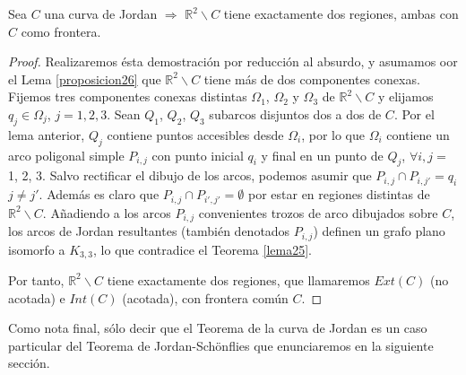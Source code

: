 \begin{theorem}
	Sea $C$ una curva de Jordan $\Rightarrow$ $\mathbb{R}^2 \backslash C$ tiene exactamente dos regiones, ambas con $C$ como frontera.
\end{theorem}

\begin{proof}
Realizaremos ésta demostración por reducción al absurdo, y asumamos oor el Lema \ref{proposicion26}  que $\mathbb{R}^2 \backslash C$ tiene más de dos componentes conexas. Fijemos  tres componentes conexas distintas $\Omega_1$, $\Omega_2$ y $\Omega_3$ de $\mathbb{R}^2 \backslash C$ y elijamos $q_j\in \Omega_j$, $j=1,2,3$.
Sean $Q_1$, $Q_2$, $Q_3$ subarcos disjuntos dos a dos de $C$. 	 Por el lema anterior, $Q_j$ contiene puntos accesibles desde $\Omega_i$, por lo que $\Omega_i$ contiene un arco poligonal simple $P_{i,j}$ con punto inicial $q_i$ y final en un punto de $Q_j$,  $\forall i,j =$ 1, 2, 3. Salvo rectificar el dibujo de los arcos, podemos asumir que $P_{i,j} \cap P_{i,j'} = {q_i}$ $j \neq j'$. Además es claro que $P_{i,j} \cap P_{i',j'} = \emptyset$ por estar en regiones distintas de $\mathbb{R}^2 \backslash C$.
Añadiendo a los arcos $P_{i,j}$ convenientes trozos de arco  dibujados sobre $C$,  los arcos de Jordan resultantes (también denotados $P_{i,j}$) definen un grafo plano isomorfo a $K_{3,3}$, lo que contradice el Teorema \ref{lema25}.

Por tanto, $\mathbb{R}^2 \backslash C$ tiene exactamente dos regiones,  que llamaremos  $Ext(C)$ (no acotada) e $Int(C)$ (acotada), con frontera común $C$.
\end{proof}

Como nota final, sólo decir que el Teorema de la curva de Jordan es un caso particular del Teorema de Jordan-Schönflies que enunciaremos en la siguiente sección.
